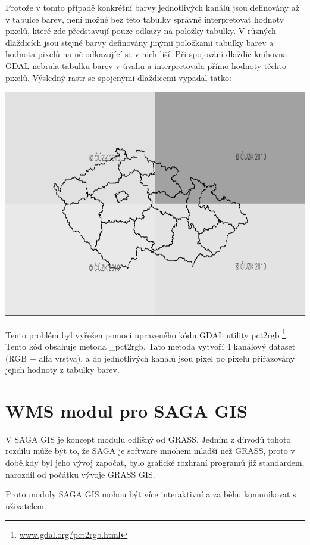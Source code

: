\documentclass[a4paper,12pt]{article}
\begin{document}
Protože v tomto případě konkrétní barvy jednotlivých kanálů jsou definovány až v tabulce barev, není možné bez této tabulky správně interpretovat hodnoty pixelů, které  zde představují pouze odkazy na položky tabulky. V různých dlaždicích jsou stejné barvy definovány jinými položkami tabulky barev a hodnota pixelů na ně odkazující se v nich liší. 
Při spojování dlaždic knihovna GDAL nebrala tabulku barev v úvahu a interpretovala přímo hodnoty těchto pixelů. Výsledný rastr se spojenými dlaždicemi vypadal tatko: 

 \includegraphics[scale=0.4]{figures/color_table_problem.png}



Tento problém byl vyřešen pomocí upraveného kódu GDAL utility pct2rgb \footnote{\url{www.gdal.org/pct2rgb.html}}. Tento kód obsahuje metoda \_pct2rgb.
Tato metoda vytvoří 4 kanálový dataset (RGB + alfa vrstva), a do jednotlivých kanálů jsou pixel po pixelu přiřazovány jejich hodnoty z tabulky barev. 

\newpage

\section{ WMS modul pro SAGA GIS}

V SAGA GIS je koncept modulu odlišný od GRASS. Jedním z důvodů tohoto rozdílu může být to, že SAGA je software mnohem mladší než GRASS, proto v době,kdy byl jeho vývoj započat, bylo grafické rozhraní programů již standardem, narozdíl 
 od počátku vývoje GRASS GIS. 

Proto moduly SAGA GIS mohou být více interaktivní a za běhu komunikovat s uživatelem.
\end{document}
